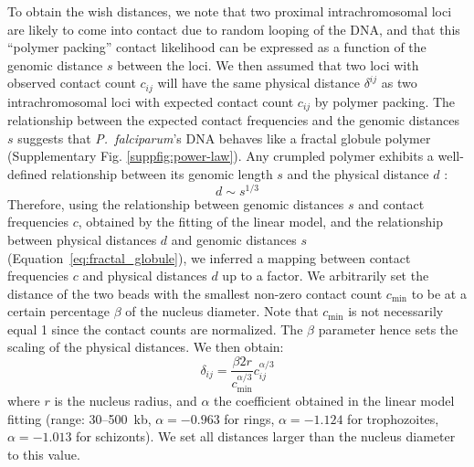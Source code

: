 To obtain the wish distances, we note that two proximal intrachromosomal loci
are likely to come into contact due to random looping of the DNA, and that
this ``polymer packing'' contact likelihood can be expressed as a function of
the genomic distance $s$ between the loci. We then assumed that two loci with
observed contact count $c_{ij}$ will have the same physical distance
$\delta^{ij}$ as two intrachromosomal loci with expected contact count
$c_{ij}$ by polymer packing. The relationship between the expected contact
frequencies and the genomic distances $s$ suggests that \textit{P.\
falciparum}'s DNA behaves like a fractal globule polymer
\citep{lieberman-aiden:comprehensive} (Supplementary Fig.
\ref*{suppfig:power-law}). Any crumpled polymer exhibits a well-defined
relationship between its genomic length $s$ and the physical distance $d$
\citep{grosberg:role}:
\begin{equation}
d \sim s^{1 / 3}
\label{eq:fractal_globule}
\end{equation}
Therefore, using the relationship between genomic distances $s$ and
contact frequencies $c$, obtained by the fitting of the linear
model, and the relationship between physical distances $d$ and genomic
distances $s$ (Equation~\ref{eq:fractal_globule}), we inferred a
mapping between contact frequencies $c$ and physical distances $d$
up to a factor. We arbitrarily set the distance of the two beads with
the smallest non-zero contact count $c_\text{min}$ to be at a
certain percentage $\beta$ of the nucleus diameter. Note that
$c_\text{min}$ is not necessarily equal 1 since the contact counts are
normalized. The $\beta$ parameter hence sets the scaling of the physical
distances. We then obtain:
\begin{equation}
\delta_{ij} = \frac{\beta 2 r}{c_\text{min}^{\alpha / 3}} c_{ij}^{\alpha / 3}
\end{equation}
where $r$ is the nucleus radius, and $\alpha$ the coefficient obtained
in the linear model fitting (range: 30--500~kb, $\alpha=-0.963$ for rings,
$\alpha = -1.124$ for trophozoites, $\alpha = -1.013$ for schizonts).
We set all distances larger than the nucleus diameter to this value.

